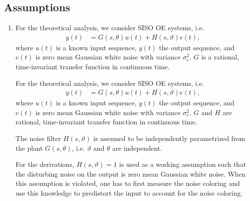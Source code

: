 \documentclass{responseletter}
\begin{document}
\subsection{Assumptions}

\begin{enumerate}

\item
{}
\begin{oldquote}
For the theoretical analysis, we consider \gls{SISO} \gls{OE} systems, i.e.
\begin{align}
y(t) &=G(s,\theta)u(t)  + H(s,\vartheta)e(t),
\end{align}
where $u(t)$ is a known input sequence, $y(t)$ the output sequence, and $e(t)$ is zero mean Gaussian white noise with variance $\sigma_{e}^2$.
$G$ is a rational, time-invariant transfer function in continuous time.
\end{oldquote}
\begin{newquote}
For the theoretical analysis, we consider \gls{SISO} \gls{OE} systems, i.e.
\begin{align}
y(t) &=G(s,\theta)u(t)  + H(s,\vartheta)e(t),
\end{align}
where $u(t)$ is a known input sequence, $y(t)$ the output sequence, and $e(t)$ is zero mean Gaussian white noise with variance $\sigma_{e}^2$.
$G$ and $H$ are rational, time-invariant transfer function in continuous time.
\omission{}
\begin{assumption}{2.1}
The noise filter $H(s,\vartheta)$ is assumed to be independently parametrized from the plant $G(s,\theta)$, i.e. $\vartheta$ and $\theta$ are independent.
\end{assumption}
\begin{assumption}{2.2}
For the derivations, $H(s,\vartheta) = 1$ is used as a working assumption such that the disturbing noise on the output is zero mean Gaussian white noise.
When this assumption is violated, one has to first measure the noise coloring and use this knowledge to predistort the input to account for the noise coloring.
\end{assumption}
\end{newquote}


\end{enumerate}
\end{document}

